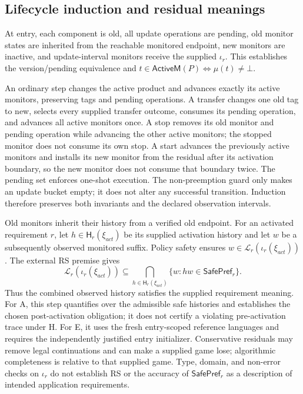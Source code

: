 \documentclass[11pt]{article}
\newcommand{\ActT}{\mathsf{ActiveM}}
\begin{document}
\subsection{Lifecycle induction and residual meanings}
At entry, each component is old, all update operations are pending, old monitor states are inherited from the reachable monitored endpoint, new monitors are inactive, and update-interval monitors receive the supplied $\iota_r$. This establishes the version/pending equivalence and $t\in\ActT(P)\iff\mu(t)\ne\bot$.

An ordinary step changes the active product and advances exactly its active monitors, preserving tags and pending operations. A transfer changes one old tag to new, selects every supplied transfer outcome, consumes its pending operation, and advances all active monitors once. A stop removes its old monitor and pending operation while advancing the other active monitors; the stopped monitor does not consume its own stop. A start advances the previously active monitors and installs its new monitor from the residual after its activation boundary, so the new monitor does not consume that boundary twice. The pending set enforces one-shot execution. The non-preemption guard only makes an update bucket empty; it does not alter any successful transition. Induction therefore preserves both invariants and the declared observation intervals.

Old monitors inherit their history from a verified old endpoint. For an activated requirement $r$, let $h\in\mathsf H_r(\xi_{act})$ be its supplied activation history and let $w$ be a subsequently observed monitored suffix. Policy safety ensures $w\in\mathcal L_r(\iota_r(\xi_{act}))$. The external RS premise gives
\[
\mathcal L_r(\iota_r(\xi_{act}))
\subseteq\bigcap_{h\in\mathsf H_r(\xi_{act})}
\{w:hw\in\mathsf{SafePref}_r\}.
\]
Thus the combined observed history satisfies the supplied requirement meaning. For A, this step quantifies over the admissible safe histories and establishes the chosen post-activation obligation; it does not certify a violating pre-activation trace under H. For E, it uses the fresh entry-scoped reference languages and requires the independently justified entry initializer. Conservative residuals may remove legal continuations and can make a supplied game lose; algorithmic completeness is relative to that supplied game. Type, domain, and non-error checks on $\iota_r$ do not establish RS or the accuracy of $\mathsf{SafePref}_r$ as a description of intended application requirements.
\end{document}
